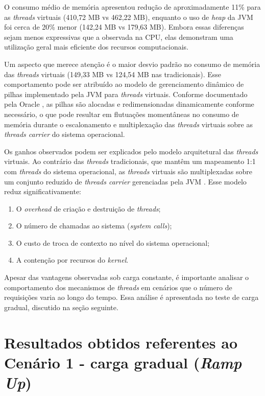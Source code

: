 \documentclass[12pt, openright, oneside, a4paper, english,	french,	spanish, brazil	]{abntex2}
\begin{document}
O consumo médio de memória apresentou redução de aproximadamente 11\% para as \textit{threads} virtuais (410,72 MB vs 462,22 MB), enquanto o uso de \textit{heap} da JVM foi cerca de 20\% menor (142,24 MB vs 179,63 MB). Embora essas diferenças sejam menos expressivas que a observada na CPU, elas demonstram uma utilização geral mais eficiente dos recursos computacionais.

Um aspecto que merece atenção é o maior desvio padrão no consumo de memória das \textit{threads} virtuais (149,33 MB vs 124,54 MB nas tradicionais). Esse comportamento pode ser atribuído ao modelo de gerenciamento dinâmico de pilhas implementado pela JVM para \textit{threads} virtuais. Conforme documentado pela Oracle \cite{oracle2025}, as pilhas são alocadas e redimensionadas dinamicamente conforme necessário, o que pode resultar em flutuações momentâneas no consumo de memória durante o escalonamento e multiplexação das \textit{threads} virtuais sobre as \textit{threads carrier} do sistema operacional.

Os ganhos observados podem ser explicados pelo modelo arquitetural das \textit{threads} virtuais. Ao contrário das \textit{threads} tradicionais, que mantêm um mapeamento 1:1 com \textit{threads} do sistema operacional, as \textit{threads} virtuais são multiplexadas sobre um conjunto reduzido de \textit{threads carrier} gerenciadas pela JVM \cite{JEP444}. Esse modelo reduz significativamente:

\begin{enumerate}
    \item O \textit{overhead} de criação e destruição de \textit{threads};
    \item O número de chamadas ao sistema (\textit{system calls});
    \item O custo de troca de contexto no nível do sistema operacional;
    \item A contenção por recursos do \textit{kernel}.
\end{enumerate}

Apesar das vantagens observadas sob carga constante, é importante analisar o comportamento dos mecanismos de \textit{threads} em cenários que o número de requisições varia ao longo do tempo. Essa análise é apresentada no teste de carga gradual, discutido na seção seguinte.

\section{Resultados obtidos referentes ao Cenário 1 - carga gradual (\textit{Ramp Up})}
\end{document}

